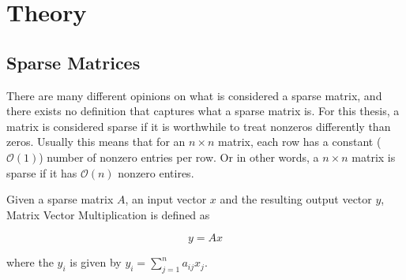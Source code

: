 
\chapter{Theory}

\section{Sparse Matrices}
There are many different opinions on what is considered a sparse matrix, and there exists no definition that captures what a sparse matrix is. For this thesis, a matrix is considered sparse if it is worthwhile to treat nonzeros differently than zeros. Usually this means that for an \(n \times n\) matrix, each row has a constant (\(\mathcal{O}\left(1\right)\)) number of nonzero entries per row. Or in other words, a \(n \times  n\) matrix is sparse if it has \(\mathcal{O}\left(n\right)\) nonzero entires.
\medskip

Given a sparse matrix \(A\), an input vector \(x\) and the resulting output vector \(y\), Matrix Vector Multiplication is defined as

\[y = Ax\]

where the \(y_{i}\) is given by \(y_{i} = \sum_{j=1}^{n}a_{ij}x_{j} \).



